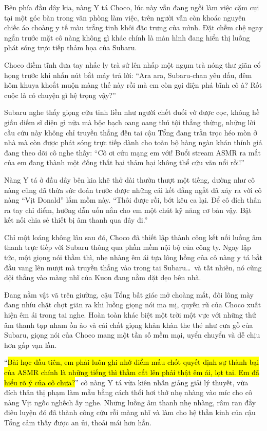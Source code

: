 \documentclass[../main.tex]{subfiles}
\begin{document}
Bên phía đầu dây kia, nàng Y tá Choco, lúc này vẫn đang ngồi làm việc cặm cụi tại một góc bàn trong văn phòng làm việc, trên người vẫn còn khoác nguyên chiếc áo choàng y tế màu trắng tinh khôi đặc trưng của mình. Đặt chễm chệ ngay ngắn trước mặt cô nàng không gì khác chính là màn hình đang hiển thị luồng phát sóng trực tiếp thảm họa của Subaru.


Choco điềm tĩnh đưa tay nhấc ly trà sứ lên nhấp một ngụm trà nóng thư giãn cổ họng trước khi nhấn nút bắt máy trả lời: ``Ara ara, Subaru-chan yêu dấu, đêm hôm khuya khoắt muộn màng thế này rồi mà em còn gọi điện phá bĩnh cô à? Rốt cuộc là có chuyện gì hệ trọng vậy?''

Subaru nghe thấy giọng cứu tinh liền như người chết đuối vớ được cọc, không hề giấu diếm sĩ diện gì nữa mà bộc bạch oang oang thú tội thẳng thừng, những lời cầu cứu này không chỉ truyền thẳng đến tai cậu Tổng đang trằn trọc héo mòn ở nhà mà còn được phát sóng trực tiếp dành cho toàn bộ hàng ngàn khán thính giả đang theo dõi cô nghe thấy: ``Cô ơi cứu mạng em với! Buổi stream ASMR ra mắt của em đang thành một đống thất bại thảm hại không thể cứu vãn nổi rồi!''

Nàng Y tá ở đầu dây bên kia khẽ thở dài thườn thượt một tiếng, dường như cô nàng cũng đã thừa sức đoán trước được những cái kết đắng ngắt đã xảy ra với cô nàng ``Vịt Donald'' lắm mồm này. ``Thôi được rồi, bớt kêu ca lại. Để cô đích thân ra tay chỉ điểm, hướng dẫn uốn nắn cho em một chút kỹ năng cơ bản vậy. Bật kết nối chia sẻ thiết bị âm thanh qua đây đi.''

Chỉ một loáng không lâu sau đó, Choco đã thiết lập thành công kết nối luồng âm thanh trực tiếp với Subaru thông qua phần mềm nội bộ của công ty. Ngay lập tức, một giọng nói thầm thì, nhẹ nhàng êm ái tựa lông hồng của cô nàng y tá bắt đầu vang lên mượt mà truyền thẳng vào trong tai Subaru\dots\ và tất nhiên, nó cũng dội thẳng vào màng nhĩ của Kuon đang nằm dặt dẹo bên nhà.

\il

Đang nằm vật vã trên giường, cậu Tổng bất giác mở choàng mắt, đôi lông mày đang nhíu chặt chợt giãn ra khi luồng giọng nói ma mị, quyến rũ của Choco xuất hiện êm ái trong tai nghe. Hoàn toàn khác biệt một trời một vực với những thứ âm thanh tạp nham ồn ào và cái chất giọng khàn khàn the thé như cưa gỗ của Subaru, giọng nói của Choco mang một tần số mềm mại, uyển chuyển và dễ chịu hơn gấp vạn lần.

``\hl{Bài học đầu tiên, em phải luôn ghi nhớ điểm mấu chốt quyết định sự thành bại của ASMR chính là những tiếng thì thầm cất lên phải thật êm ái, lọt tai. Em đã hiểu rõ ý của cô chưa?}'' cô nàng Y tá vừa kiên nhẫn giảng giải lý thuyết, vừa đích thân thị phạm làm mẫu bằng cách thổi hơi thở nhẹ nhàng vào míc cho cô nàng Vịt ngốc nghếch ấy nghe. Những luồng âm thanh nhẹ nhàng, râm ran đầy điêu luyện đó đã thành công cứu rỗi màng nhĩ và làm cho hệ thần kinh của cậu Tổng cảm thấy được an ủi, thoải mái hơn hẳn.
\end{document}
